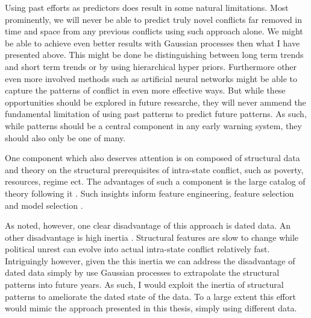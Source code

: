 \documentclass[a4paper]{article}
\begin{document}
Using past efforts as predictors does result in some natural limitations. Most prominently, we will never be able to predict truly novel conflicts far removed in time and space from any previous conflicts using such approach alone. We might be able to achieve even better results with Gaussian processes then what I have presented above. This might be done be distinguishing between long term trends and short term trends or by using hierarchical hyper priors. Furthermore other even more involved methods such as artificial neural networks might be able to capture the patterns of conflict in even more effective ways. But while these opportunities should be explored in future researche, they will never ammend the fundamental limitation of using past patterns to predict future patterns. As such, while patterns should be a central component in any early warning system, they should also only be one of many.\par


One component which also deserves attention is on composed of structural data and theory on the structural prerequisites of intra-state conflict, such as poverty, resources, regime ect. The advantages of such a component is the large catalog of theory following it \citep{Collier_Hoeffler_1998, Fearon_Laitin_2003, Collier_Hoeffler_2004, Hegre_Sambanis_2006, Kalyvas_2007, Goldstone_2010, Cederman_Gleditsch_Buhaug_2013, perry_2013}. Such insights inform feature engineering, feature selection and model selection \cite[30]{Cederman_Gleditsch_Buhaug_2013}.\par

As noted, however, one clear disadvantage of this approach is dated data. An other disadvantage is high inertia \citep[10]{chadefaux2017conflict}. Structural features are slow to change while political unrest can evolve into actual intra-state conflict relatively fast. Intriguingly however, given the this inertia we can address the disadvantage of dated data simply by use Gaussian processes to extrapolate the structural patterns into future years. As such, I would exploit the inertia of structural patterns to ameliorate the dated state of the data. To a large extent this effort would mimic the approach presented in this thesis, simply using different data.\par
\end{document}
